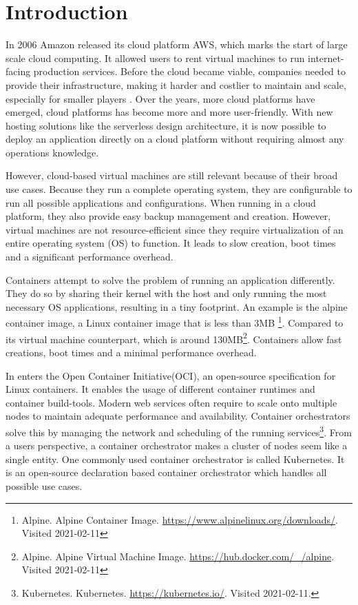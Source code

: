 \def\cloudhistory{https://www.dataversity.net/brief-history-cloud-computing/}

\chapter{Introduction}
In 2006 Amazon released its cloud platform AWS, which marks the start of large scale cloud computing. It allowed users to rent virtual machines to run internet-facing production services. Before the cloud became viable, companies needed to provide their infrastructure, making it harder and costlier to maintain and scale, especially for smaller players \cite{cost_analysis}. Over the years, more cloud platforms have emerged, cloud platforms has become more and more user-friendly. With new hosting solutions like the serverless design architecture\cite{serverless}, it is now possible to deploy an application directly on a cloud platform without requiring almost any operations knowledge.

However, cloud-based virtual machines are still relevant because of their broad use cases. Because they run a complete operating system\cite{vms_function}, they are configurable to run all possible applications and configurations. When running in a cloud platform, they also provide easy backup management and creation. However, virtual machines are not resource-efficient since they require virtualization of an entire operating system (OS) to function. It leads to slow creation, boot times and a significant performance overhead. 

Containers attempt to solve the problem of running an application differently. They do so by sharing their kernel with the host and only running the most necessary OS applications\cite{linux_containers}, resulting in a tiny footprint. An example is the alpine container image, a Linux container image that is less than 3MB
\footnote{Alpine. Alpine Container Image. \url{https://www.alpinelinux.org/downloads/}. Visited 2021-02-11}. Compared to its virtual machine counterpart, which is around 130MB\footnote{Alpine. Alpine Virtual Machine Image. \url{https://hub.docker.com/_/alpine}. Visited 2021-02-11}. Containers allow fast creations, boot times and a minimal performance overhead. 

In enters the Open Container Initiative(OCI), an open-source specification for Linux containers\cite{oci_spec}. It enables the usage of different container runtimes and container build-tools. Modern web services often require to scale onto multiple nodes to maintain adequate performance and availability. Container orchestrators solve this by managing the network and scheduling of the running services\footnote{Kubernetes. Kubernetes. \url{https://kubernetes.io/}. Visited 2021-02-11.}. From a users perspective, a container orchestrator makes a cluster of nodes seem like a single entity. One commonly used container orchestrator is called Kubernetes. It is an open-source declaration based container orchestrator which handles all possible use cases. 


